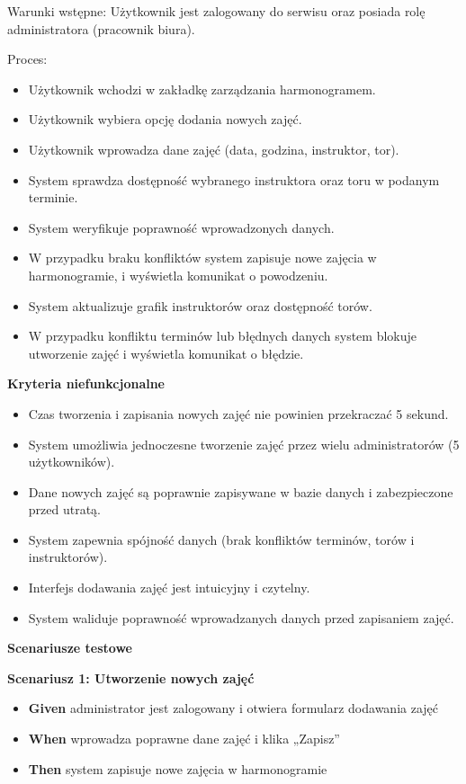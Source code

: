 \documentclass[a4paper,12pt]{article}
\begin{document}
\vspace{0,2cm}

\noindent Warunki wstępne: Użytkownik jest zalogowany do serwisu oraz posiada rolę administratora (pracownik biura).

\vspace{0,2cm}

\noindent Proces:

\begin{itemize}
    \item Użytkownik wchodzi w zakładkę zarządzania harmonogramem.
    \item Użytkownik wybiera opcję dodania nowych zajęć.
    \item Użytkownik wprowadza dane zajęć (data, godzina, instruktor, tor).
    \item System sprawdza dostępność wybranego instruktora oraz toru w podanym terminie.
    \item System weryfikuje poprawność wprowadzonych danych.
    \item W przypadku braku konfliktów system zapisuje nowe zajęcia w harmonogramie, i wyświetla komunikat o powodzeniu.
    \item System aktualizuje grafik instruktorów oraz dostępność torów.
    \item W przypadku konfliktu terminów lub błędnych danych system blokuje utworzenie zajęć i wyświetla komunikat o błędzie.
\end{itemize}

\noindent \textbf{Kryteria niefunkcjonalne}
\begin{itemize}
    \item Czas tworzenia i zapisania nowych zajęć nie powinien przekraczać 5 sekund.
    \item System umożliwia jednoczesne tworzenie zajęć przez wielu administratorów (5 użytkowników).
    \item Dane nowych zajęć są poprawnie zapisywane w bazie danych i zabezpieczone przed utratą.
    \item System zapewnia spójność danych (brak konfliktów terminów, torów i instruktorów).
    \item Interfejs dodawania zajęć jest intuicyjny i czytelny.
    \item System waliduje poprawność wprowadzanych danych przed zapisaniem zajęć.
\end{itemize}

\noindent \textbf{Scenariusze testowe}

\textbf{Scenariusz 1: Utworzenie nowych zajęć}
\begin{itemize}
    \item \textbf{Given} administrator jest zalogowany i otwiera formularz dodawania zajęć
    \item \textbf{When} wprowadza poprawne dane zajęć i klika „Zapisz”
    \item \textbf{Then} system zapisuje nowe zajęcia w harmonogramie
\end{itemize}
\end{document}
